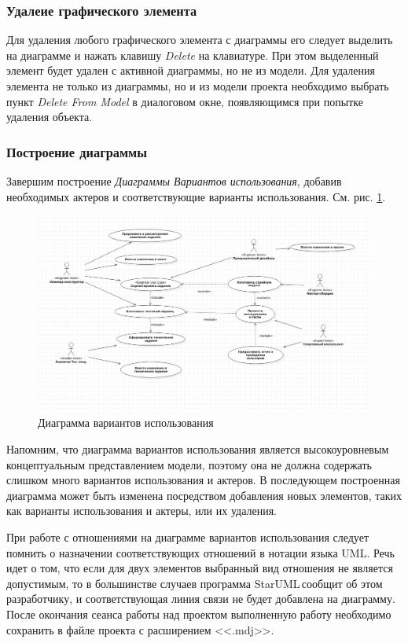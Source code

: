 \documentclass[a4paper,12pt]{extreport}
\newcommand{\staruml}{StarUML\,\tm}
\begin{document}
\subsubsection*{Удалеие графического элемента}
Для удаления любого графического элемента с диаграммы его следует выделить на диаграмме и нажать клавишу \textit{Delete} на клавиатуре. При этом выделенный элемент будет удален с активной диаграммы, но не из модели. Для удаления элемента не только из диаграммы, но и из модели проекта необходимо выбрать пункт \textit{Delete From Model} в диалоговом окне, появляющимся при попытке удаления объекта. 

\subsubsection*{Построение диаграммы}
Завершим построение \textit{Диаграммы Вариантов использования}, добавив необходимых актеров и соответствующие варианты использования. См. рис. \ref{fig:usecase}.
\newpage
\begin{figure}[h!]
	\centering
	\includegraphics[width=\linewidth]{images/usecase}
	\caption{Диаграмма вариантов использования}
	\label{fig:usecase}
\end{figure}

Напомним, что диаграмма вариантов использования является высокоуровневым концептуальным представлением модели, поэтому она не должна содержать слишком много вариантов использования и актеров. В последующем построенная диаграмма может быть изменена посредством добавления новых элементов, таких как варианты использования и актеры, или их удаления.

При работе с отношениями на диаграмме вариантов использования следует помнить о назначении соответствующих отношений в нотации языка UML. Речь идет о том, что если для двух элементов выбранный вид отношения не является допустимым, то в большинстве случаев программа \staruml сообщит об этом разработчику, и соответствующая линия связи не будет добавлена на диаграмму.
После окончания сеанса работы над проектом выполненную работу необходимо сохранить в файле проекта с расширением <<.mdj>>. 
\end{document}
